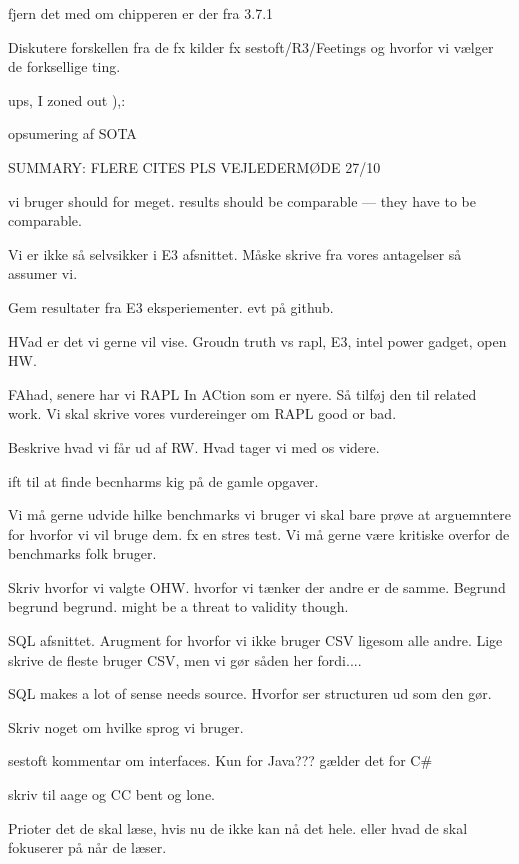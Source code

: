 
fjern det med om chipperen er der fra 3.7.1



Diskutere forskellen fra de fx kilder fx sestoft/R3/Feetings og hvorfor vi vælger de forksellige ting. 

ups, I zoned out ),:

opsumering af SOTA 

SUMMARY: FLERE CITES PLS
VEJLEDERMØDE 27/10

vi bruger should for meget. results should be comparable --- they have to be comparable. 

Vi er ikke så selvsikker i E3 afsnittet. Måske skrive fra vores antagelser så assumer vi.

Gem resultater fra E3 eksperiementer. evt på github.

HVad er det vi gerne vil vise.  Groudn truth vs rapl, E3, intel power gadget, open HW. 

FAhad, senere har vi RAPL In ACtion som er nyere. Så tilføj den til related work. Vi skal skrive vores vurdereinger om RAPL good or bad. 

Beskrive hvad vi får ud af RW. Hvad tager vi med os videre.

ift til at finde becnharms kig på de gamle opgaver. 

Vi må gerne udvide hilke benchmarks vi bruger vi skal bare prøve at arguemntere for hvorfor vi vil bruge dem. fx en stres test. Vi må gerne være kritiske overfor de benchmarks folk bruger.

Skriv hvorfor vi valgte OHW. hvorfor vi tænker der andre er de samme. Begrund begrund begrund.  might be a threat to validity though.

SQL afsnittet. Arugment for hvorfor vi ikke bruger CSV ligesom alle andre. Lige skrive de fleste bruger CSV, men vi gør såden her fordi....

SQL makes a lot of sense needs source. 
Hvorfor ser structuren ud som den gør.

Skriv noget om hvilke sprog vi bruger. 

sestoft kommentar om interfaces. Kun for Java???  gælder det for C#

skriv til aage og CC bent og lone.

Prioter det de skal læse, hvis nu de ikke kan nå det hele. eller hvad de skal fokuserer på når de læser.

